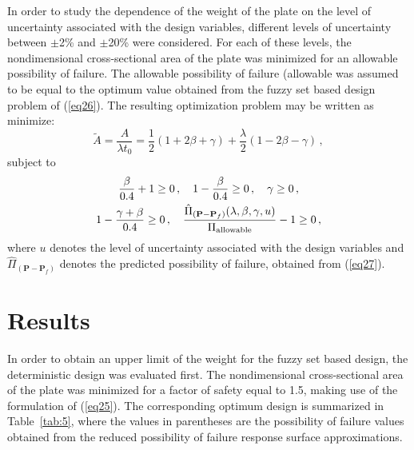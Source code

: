 \documentclass[stropt]{svjour}
\def\p{\mathbf{P}}%
\begin{document}
In order to study the dependence of the weight of the plate on the level of
uncertainty associated with the design variables, different levels of
uncertainty between $\pm$2\% and $\pm$20\% were considered.
For each of these levels, the nondimensional cross-sectional area of the
plate was minimized for an allowable possibility of failure.
The allowable possibility of failure (allowable was assumed to be equal to the
optimum value obtained from the fuzzy set based design problem of
(\ref{eq26}).
The resulting optimization problem may be written as\\[6pt]
minimize:
\[
\tilde{A}=\frac{A}{\lambda t_0}=\frac12 (1+2\beta+\gamma)+\frac{\lambda}{2}
(1-2\beta-\gamma)\, ,
\]
subject to
\begin{gather}
\frac{\beta}{0.4}+1\geq 0\, ,\quad
1-\frac{\beta}{0.4}\geq 0\, ,\quad
\gamma\geq 0\, ,\notag\\
1-\frac{\gamma+\beta}{0.4}\geq 0\, ,\quad
\frac{\hat{\Pi}_{(\p-\p_f)}(\lambda,\beta,\gamma,u)}{\Pi_{{\rm allowable}}}
-1\geq0\, ,    \label{eq28}
\end{gather}
where $u$ denotes the level of uncertainty associated with the design
variables and $\hat{\Pi}_{(\p-\p_f)}$ denotes the predicted possibility of
failure, obtained from (\ref{eq27}).


\section{Results}
\label{sec06}

In order to obtain an upper limit of the weight for the fuzzy set based
design, the deterministic design was evaluated first.
The nondimensional cross-sectional area of the plate was minimized for a
factor of safety equal to 1.5, making use of the formulation of (\ref{eq25}).
The corresponding optimum design is summarized in Table~\ref{tab:5},
where the values in parentheses are the possibility of failure values obtained
from the reduced possibility of failure response surface approximations.
\end{document}

